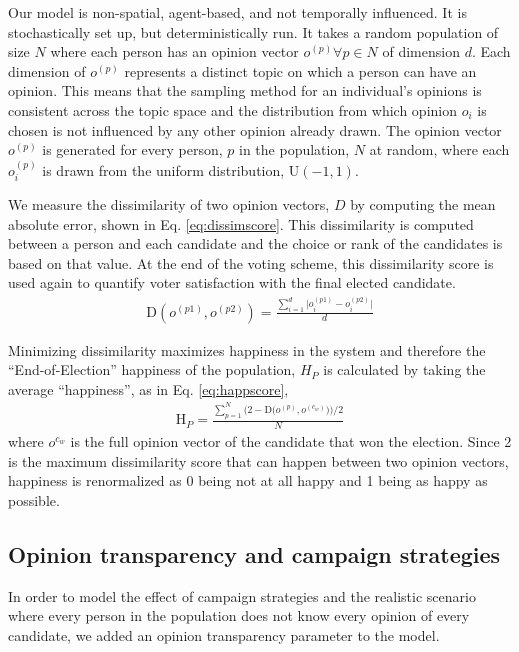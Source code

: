 
Our model is non-spatial, agent-based, and not temporally influenced.
It is stochastically set up, but deterministically run.
It takes a random population of size $N$ where each person has an opinion vector $o^{(p)} \forall p \in N$ of dimension $d$.
Each dimension of $o^{(p)}$ represents a distinct topic on which a person can have an opinion.
This means that the sampling method for an individual's opinions is consistent across the topic space and the distribution from which opinion $o_i$ is chosen is not influenced by any other opinion already drawn.
The opinion vector $o^{(p)}$ is generated for every person, $p$ in the population, $N$ at random, where each $o^{(p)}_i$ is drawn from the uniform distribution, U$(-1,1)$.

We measure the dissimilarity of two opinion vectors, $D$ by computing the mean absolute error, shown in Eq. \ref{eq:dissimscore}.
This dissimilarity is computed between a person and each candidate and the choice or rank of the candidates is based on that value.
At the end of the voting scheme, this dissimilarity score is used again to quantify voter satisfaction with the final elected candidate.
\begin{align}
\text{D}(o^{(p1)},o^{(p2)}) = \frac{\sum_{i=1}^{d}\Big|o^{(p1)}_i - o^{(p2)}_i\Big|}{d}
\label{eq:dissimscore}
\end{align}

Minimizing dissimilarity maximizes happiness in the system and therefore the ``End-of-Election'' happiness of the population, $H_P$ is calculated by taking the average ``happiness'', as in Eq. \ref{eq:happscore},
\begin{align}
\text{H}_{P} =
\frac{\sum_{p=1}^{N} \Big(2 - \text{D} \big(o^{(p)},o^{(c_w)}\big)\Big) / 2 }{N}
\label{eq:happscore}
\end{align}
where $o^{c_w}$ is the full opinion vector of the candidate that won the election.
Since 2 is the maximum dissimilarity score that can happen between two opinion vectors, happiness is renormalized as 0 being not at all happy and 1 being as happy as possible.

\subsection{Opinion transparency and campaign strategies}
In order to model the effect of campaign strategies and the realistic scenario where every person in the population does not know every opinion of every candidate, we added an opinion transparency parameter to the model.

